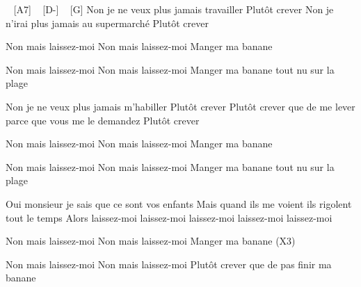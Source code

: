 \begin{guitar}
[C] ~ [A7] ~ [D-] ~ [G]
Non je ne veux plus jamais travailler
Plutôt crever
Non je n'irai plus jamais au supermarché
Plutôt crever

Non mais laissez-moi
Non mais laissez-moi
Manger ma banane

Non mais laissez-moi
Non mais laissez-moi
Manger ma banane tout nu sur la plage

Non je ne veux plus jamais m'habiller
Plutôt crever
Plutôt crever que de me lever parce que vous me le demandez
Plutôt crever

Non mais laissez-moi
Non mais laissez-moi
Manger ma banane

Non mais laissez-moi
Non mais laissez-moi
Manger ma banane tout nu sur la plage

Oui monsieur je sais que ce sont vos enfants
Mais quand ils me voient ils rigolent tout le temps
Alors laissez-moi laissez-moi laissez-moi laissez-moi
laissez-moi

Non mais laissez-moi
Non mais laissez-moi
Manger ma banane
(X3)

Non mais laissez-moi
Non mais laissez-moi
Plutôt crever que de pas finir ma banane 
\end{guitar}